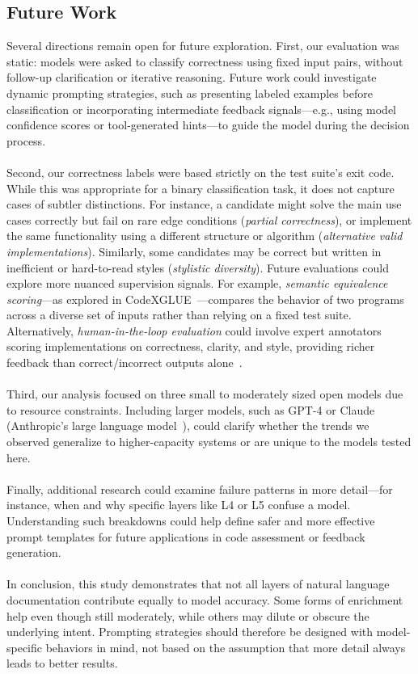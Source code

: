 \documentclass[a4paper]{usiinfbachelorproject}
\begin{document}
\subsection*{Future Work}
Several directions remain open for future exploration. First, our evaluation was static: models were asked to classify correctness using fixed input pairs, without follow-up clarification or iterative reasoning. Future work could investigate dynamic prompting strategies, such as presenting labeled examples before classification or incorporating intermediate feedback signals—e.g., using model confidence scores or tool-generated hints—to guide the model during the decision process. \\
\\
Second, our correctness labels were based strictly on the test suite's exit code. While this was appropriate for a binary classification task, it does not capture cases of subtler distinctions. For instance, a candidate might solve the main use cases correctly but fail on rare edge conditions (\textit{partial correctness}), or implement the same functionality using a different structure or algorithm (\textit{alternative valid implementations}). Similarly, some candidates may be correct but written in inefficient or hard-to-read styles (\textit{stylistic diversity}). Future evaluations could explore more nuanced supervision signals. For example, \textit{semantic equivalence scoring}—as explored in CodeXGLUE~\cite{Lu2021codexglue}—compares the behavior of two programs across a diverse set of inputs rather than relying on a fixed test suite. Alternatively, \textit{human-in-the-loop evaluation} could involve expert annotators scoring implementations on correctness, clarity, and style, providing richer feedback than correct/incorrect outputs alone~\cite{smith2021human}. \\
\\
Third, our analysis focused on three small to moderately sized open models due to resource constraints. Including larger models, such as GPT-4 or Claude (Anthropic's large language model~\cite{claude2023blog}), could clarify whether the trends we observed generalize to higher-capacity systems or are unique to the models tested here.\\
\\
Finally, additional research could examine failure patterns in more detail—for instance, when and why specific layers like L4 or L5 confuse a model. Understanding such breakdowns could help define safer and more effective prompt templates for future applications in code assessment or feedback generation.\\
\\
In conclusion, this study demonstrates that not all layers of natural language documentation contribute equally to model accuracy. Some forms of enrichment help even though still moderately, while others may dilute or obscure the underlying intent. Prompting strategies should therefore be designed with model-specific behaviors in mind, not based on the assumption that more detail always leads to better results.\\



\end{document}
